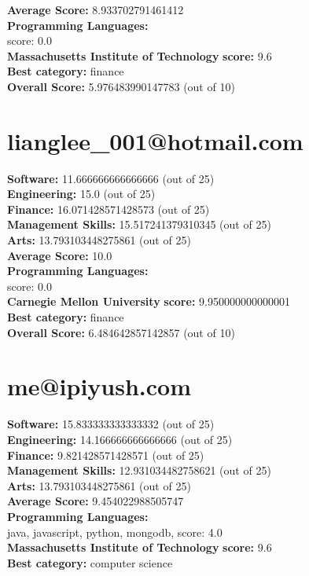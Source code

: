 \documentclass{article}
\begin{document}
\textbf{Average Score: } 8.933702791461412\\
\textbf{Programming Languages:} \\
score: 0.0\\
\textbf{Massachusetts Institute of Technology} \textbf{score:} 9.6\\
\textbf{Best category: } finance\\
\textbf{Overall Score: }5.976483990147783 (out of 10)\section{lianglee_001@hotmail.com}
\textbf{Software:} 11.666666666666666 (out of 25)\\
\textbf{Engineering: } 15.0 (out of 25)\\
\textbf{Finance:} 16.071428571428573 (out of 25)\\
\textbf{Management Skills:} 15.517241379310345 (out of 25)\\
\textbf{Arts:} 13.793103448275861 (out of 25)\\
\textbf{Average Score: } 10.0\\
\textbf{Programming Languages:} \\
score: 0.0\\
\textbf{Carnegie Mellon University} \textbf{score:} 9.950000000000001\\
\textbf{Best category: } finance\\
\textbf{Overall Score: }6.484642857142857 (out of 10)\section{me@ipiyush.com}
\textbf{Software:} 15.833333333333332 (out of 25)\\
\textbf{Engineering: } 14.166666666666666 (out of 25)\\
\textbf{Finance:} 9.821428571428571 (out of 25)\\
\textbf{Management Skills:} 12.931034482758621 (out of 25)\\
\textbf{Arts:} 13.793103448275861 (out of 25)\\
\textbf{Average Score: } 9.454022988505747\\
\textbf{Programming Languages:} \\
java, javascript, python, mongodb, score: 4.0\\
\textbf{Massachusetts Institute of Technology} \textbf{score:} 9.6\\
\textbf{Best category: } computer science\\
\end{document}
